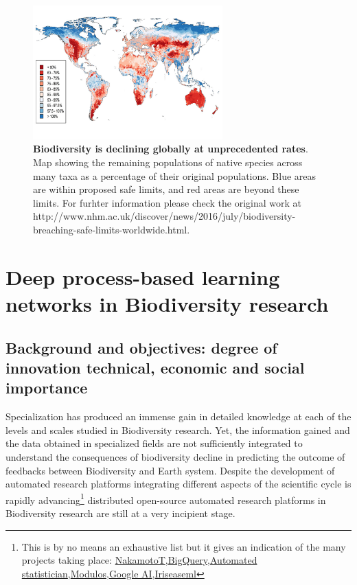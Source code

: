 \documentclass[authoryear,1p,12pt]{elsarticle}
\begin{document}
\newpage

\begin{figure}
  \begin{center}
       \includegraphics[width=0.65\textwidth]{Figure1}
     \end{center}
     \vspace{-0.7 in}
     \caption{{\bf Biodiversity is declining globally at unprecedented
         rates}. Map showing the remaining populations of native
       species across many taxa as a percentage of their original
       populations. Blue areas are within proposed safe limits, and
       red areas are beyond these limits. For furhter information
       please check the original work at
       {http://www.nhm.ac.uk/discover/news/2016/july/biodiversity-breaching-safe-limits-worldwide.html}.}
\end{figure}


\pagebreak
\section{{\bf Deep process-based learning networks in Biodiversity research}}
\subsection{Background and objectives: degree of innovation technical, economic and social importance}

\noindent Specialization has produced an immense gain in detailed
knowledge at each of the levels and scales studied in Biodiversity
research. Yet, the information gained and the data obtained in
specialized fields are not sufficiently integrated to understand the
consequences of biodiversity decline in predicting the outcome of
feedbacks between Biodiversity and Earth system. Despite the
development of automated research platforms integrating different
aspects of the scientific cycle is rapidly advancing\footnote{This is
  by no means an exhaustive list but it gives an indication of the
  many projects taking place:
  \href{https://www.nterminal.com}{NakamotoT},\href{https://cloud.google.com/bigquery/}{BigQuery},\href{https://www.automaticstatistician.com/index/}{Automated
    statistician},\href{http://www.modulos.ai/}{Modulos},\href{https://ai.google/}{Google
    AI},\href{https://iris.ai}{Iris}\href{https://github.com/DS3Lab/easeml}{easeml}}
distributed open-source automated research platforms in Biodiversity
research are still at a very incipient stage.
\end{document}
